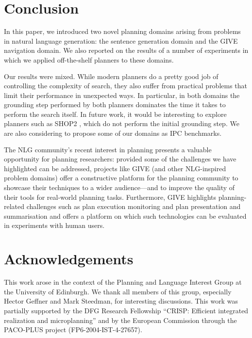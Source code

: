 \section{Conclusion} \label{sec:conclusion}

In this paper, we introduced two novel planning domains arising from
problems in natural language generation: the sentence generation
domain and the GIVE navigation domain. We also reported on the results
of a number of experiments in which we applied off-the-shelf planners
to these domains.

Our results were mixed. While modern planners do a pretty good job of
controlling the complexity of search, they also suffer from practical
problems that limit their performance in unexpected ways. In
particular, in both domains the grounding step performed by both
planners dominates the time it takes to perform the search itself. In
future work, it would be interesting to explore planners such as SHOP2
\cite{DBLP:journals/jair/NauAIKMWY03}, which do not perform the
initial grounding step.  We are also considering to propose some of
our domains as IPC benchmarks.

The NLG community's recent interest in planning presents a valuable
opportunity for planning researchers: provided some of the challenges
we have highlighted can be addressed, projects like GIVE (and other
NLG-inspired problem domains) offer a constructive platform for the
planning community to showcase their techniques to a wider
audience---and to improve the quality of their tools for real-world
planning tasks.  Furthermore, GIVE highlights planning-related
challenges such as plan execution monitoring and plan presentation
and summarisation and offers a platform on which such technologies can
be evaluated in experiments with human users.

\section{Acknowledgements}
This work arose in the context of the Planning and Language Interest Group
at the University of Edinburgh. We thank all members of this group,
especially Hector Geffner and Mark Steedman, for interesting discussions.
This work was partially supported by the DFG Research Fellowship ``CRISP:
Efficient integrated realization and microplanning'' and by the European
Commission through the PACO-PLUS project (FP6-2004-IST-4-27657).


